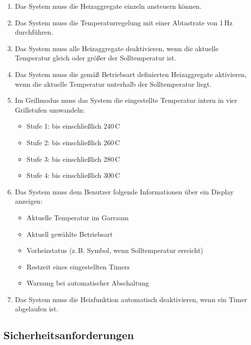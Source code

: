 \documentclass[a4paper,12pt]{article}
\begin{document}
\begin{enumerate}[label=\textbf{2.1.\arabic*}, itemsep=0pt, topsep=0pt, font=\bfseries]
\begin{itemize}
    \end{itemize}
    \item Das System muss die Heizaggregate einzeln ansteuern können.
    \item Das System muss die Temperaturregelung mit einer Abtastrate von 1\,Hz durchführen.
    \item Das System muss alle Heizaggregate deaktivieren, wenn die aktuelle Temperatur gleich oder größer der Solltemperatur ist.
    \item Das System muss die gemäß Betriebsart definierten Heizaggregate aktivieren, wenn die aktuelle Temperatur unterhalb der Solltemperatur liegt.
    \item Im Grillmodus muss das System die eingestellte Temperatur intern in vier Grillstufen umwandeln:
    \begin{itemize}
        \item Stufe 1: bis einschließlich 240\,\textdegree{}C
        \item Stufe 2: bis einschließlich 260\,\textdegree{}C
        \item Stufe 3: bis einschließlich 280\,\textdegree{}C
        \item Stufe 4: bis einschließlich 300\,\textdegree{}C
    \end{itemize}
    \item Das System muss dem Benutzer folgende Informationen über ein Display anzeigen:
    \begin{itemize}
        \item Aktuelle Temperatur im Garraum
        \item Aktuell gewählte Betriebsart
        \item Vorheizstatus (z.\,B. Symbol, wenn Solltemperatur erreicht)
        \item Restzeit eines eingestellten Timers
        \item Warnung bei automatischer Abschaltung
    \end{itemize}
    \item Das System muss die Heizfunktion automatisch deaktivieren, wenn ein Timer abgelaufen ist.
\end{enumerate}

\subsection{Sicherheitsanforderungen}
\end{document}
